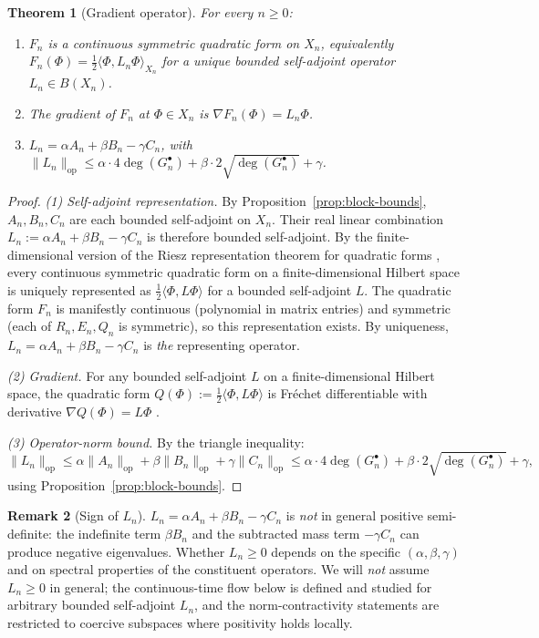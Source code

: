 \documentclass[11pt, a4paper]{amsart}
\newtheorem{theorem}{Theorem}[section]
\theoremstyle{definition}
\newtheorem{remark}[theorem]{Remark}
\newcommand{\op}{\operatorname{op}}
\begin{document}
\begin{theorem}[Gradient operator]
\label{thm:gradient-operator}
For every $n \geq 0$:
\begin{enumerate}
\item $F_n$ is a continuous symmetric quadratic form on $X_n$,
  equivalently $F_n(\Phi) = \tfrac{1}{2} \langle \Phi, L_n \Phi
  \rangle_{X_n}$ for a unique bounded self-adjoint operator
  $L_n \in B(X_n)$.
\item The gradient of $F_n$ at $\Phi \in X_n$ is
  $\nabla F_n(\Phi) = L_n \Phi$.
\item $L_n = \alpha A_n + \beta B_n - \gamma C_n$, with
  $\|L_n\|_{\op} \leq \alpha \cdot 4\deg(G_n^\bullet) + \beta \cdot
  2\sqrt{\deg(G_n^\bullet)} + \gamma$.
\end{enumerate}
\end{theorem}

\begin{proof}
\emph{(1) Self-adjoint representation.} By
Proposition~\ref{prop:block-bounds}, $A_n, B_n, C_n$ are each
bounded self-adjoint on $X_n$. Their real linear combination
$L_n := \alpha A_n + \beta B_n - \gamma C_n$ is therefore bounded
self-adjoint. By the finite-dimensional version of the
Riesz representation theorem for quadratic forms
\cite[Prop.~I.3.14]{ReedSimonI}, every continuous symmetric
quadratic form on a finite-dimensional Hilbert space is uniquely
represented as $\tfrac{1}{2} \langle \Phi, L \Phi \rangle$ for a
bounded self-adjoint $L$. The quadratic form $F_n$ is manifestly
continuous (polynomial in matrix entries) and symmetric (each of
$R_n, E_n, Q_n$ is symmetric), so this representation exists. By
uniqueness, $L_n = \alpha A_n + \beta B_n - \gamma C_n$ is
\emph{the} representing operator.

\emph{(2) Gradient.} For any bounded self-adjoint $L$ on a
finite-dimensional Hilbert space, the quadratic form $Q(\Phi) :=
\tfrac{1}{2} \langle \Phi, L \Phi \rangle$ is Fr\'echet
differentiable with derivative $\nabla Q(\Phi) = L \Phi$
\cite[\S 4.6]{HornJohnson}.

\emph{(3) Operator-norm bound.} By the triangle inequality:
\[
  \|L_n\|_{\op} \leq \alpha \|A_n\|_{\op} + \beta \|B_n\|_{\op} +
    \gamma \|C_n\|_{\op} \leq \alpha \cdot 4\deg(G_n^\bullet) +
    \beta \cdot 2\sqrt{\deg(G_n^\bullet)} + \gamma,
\]
using Proposition~\ref{prop:block-bounds}.
\end{proof}

\begin{remark}[Sign of $L_n$]
\label{rmk:Ln-sign}
$L_n = \alpha A_n + \beta B_n - \gamma C_n$ is \emph{not} in
general positive semi-definite: the indefinite term $\beta B_n$
and the subtracted mass term $-\gamma C_n$ can produce negative
eigenvalues. Whether $L_n \geq 0$ depends on the specific
$(\alpha, \beta, \gamma)$ and on spectral properties of the
constituent operators. We will \emph{not} assume $L_n \geq 0$ in
general; the continuous-time flow below is defined and studied
for arbitrary bounded self-adjoint $L_n$, and the
norm-contractivity statements are restricted to coercive
subspaces where positivity holds locally.
\end{remark}
\end{document}
